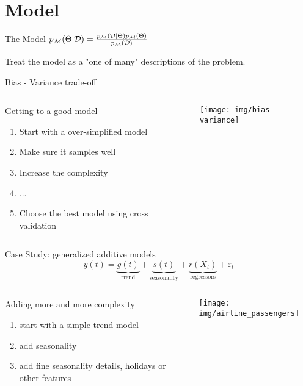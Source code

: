 \documentclass{beamer}
\begin{document}
\section{Model}
\begin{frame}{The Model}
    \center
    { \Huge $p_{\mathcal{M}}(\Theta|{\mathcal{D}})
    =\frac{
        p_{\mathcal{M}}({\mathcal{D}}|\Theta)p_{\mathcal{M}}(\Theta)
        }{
        p_{\mathcal{M}}({\mathcal{D}})
        }$}
\vfill
\begin{block}{}
Treat the model as a "one of many" descriptions of the problem.
\end{block}
\end{frame}
\begin{frame}{Bias - Variance trade-off}
\begin{columns}
\begin{column}{0.4\linewidth}
Getting to a good model
\begin{enumerate}
    \item Start with a over-simplified model
    \item Make sure it samples well
    \item Increase the complexity
    \item ...
    \item Choose the best model using cross validation
\end{enumerate}
\end{column}
\begin{column}{0.6\linewidth}
\texttt{[image: img/bias-variance]}
\end{column}
\end{columns}
\end{frame}
\begin{frame}{Case Study: generalized additive models}
\begin{equation*}
    y(t)= \underbrace{g(t)}_{\text{trend}} + \underbrace{s(t)}_{\text{seasonality}} + \underbrace{r(X_t)}_{\text{regressors}} + \varepsilon_t
\end{equation*}
\begin{columns}
\begin{column}{0.5\linewidth}
Adding more and more complexity
\begin{enumerate}
    \item start with a simple trend model
    \item add seasonality
    \item add fine seasonality details, holidays or other features
\end{enumerate}
\end{column}
\begin{column}{0.5\linewidth}
\texttt{[image: img/airline\_passengers]}
\end{column}
\end{columns}
\end{frame}
\end{document}

